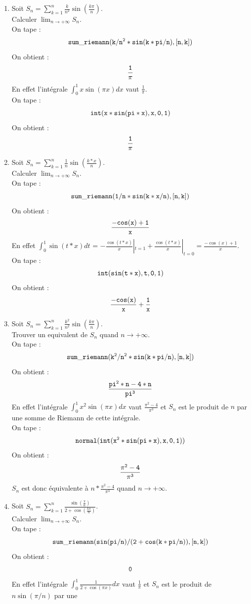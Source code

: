 \documentclass[a4paper,11pt]{book}
\begin{document}
\begin{enumerate} 
\item
Soit $\displaystyle S_n=\sum_{k=1}^n \frac{k}{n^2} \sin(\frac{k\pi}{n})$.\\
Calculer $\displaystyle \lim_{n \rightarrow +\infty} S_n$.\\
On tape :
$${\tt sum\_riemann(k/n^2*sin(k*pi/n),[n,k])}$$
On obtient :
$${\tt \frac{1}{\pi}}$$
En effet l'int\'egrale $\displaystyle \int_0^1 x \sin(\pi x)dx$ vaut
 $\displaystyle \frac{1}{\pi}$.\\
 On tape :
$${\tt int(x*sin(pi*x),x,0,1)}$$
On obtient :
$${\tt \frac{1}{\pi}}$$
\item
Soit $\displaystyle S_n=\sum_{k=1}^n \frac{1}{n} \sin(\frac{k*x}{n})$.\\
Calculer $\displaystyle \lim_{n \rightarrow +\infty} S_n$.\\
On tape :
$${\tt sum\_riemann(1/n*sin(k*x/n),[n,k])}$$
On obtient :
$${\tt \frac{-cos(x)+1}{x}}$$
En effet $\displaystyle \int_0^1 \sin(t* x)dt$ = $\displaystyle -\frac{\cos(t*x)}{x}|_{t=1} +\frac{\cos(t*x)}{x}|_{t=0}=\frac{-\cos(x)+1}{x}$.\\
 On tape :
$${\tt int(sin(t*x),t,0,1)}$$
On obtient :
$${\tt \frac{-cos(x)}{x}+\frac{1}{x}}$$
\item
Soit $\displaystyle S_n=\sum_{k=1}^n \frac{k^2}{n^2} \sin(\frac{k\pi}{n})$.\\
Trouver un equivalent de $S_n$ quand $n \rightarrow +\infty$.\\
On tape :
$${\tt sum\_riemann(k^2/n^2*sin(k*pi/n),[n,k])}$$
On obtient :
$${\tt \frac{pi^2*n-4*n}{pi^3}}$$
En effet l'int\'egrale $\displaystyle \int_0^1 x^2 \sin(\pi x)dx$ vaut
 $\displaystyle\frac{\pi^2-4}{\pi^3}$ et $S_n$ est le produit de $n$ par une somme
de Riemann de cette int\'egrale.\\
 On tape :
$${\tt normal(int(x^2*sin(pi*x),x,0,1))}$$
On obtient :
$${\tt \frac{\pi^2-4}{\pi^3}}$$
$S_n$ est donc \'equivalente \`a $\displaystyle n*\frac{\pi^2-4}{\pi^3}$
quand $n \rightarrow +\infty$. 
\item
Soit $\displaystyle S_n=\sum_{k=1}^n \frac{\sin(\frac{\pi}{n})}{2+\cos(\frac{k\pi}{n})}$.\\
Calculer $\displaystyle \lim_{n \rightarrow +\infty} S_n$.\\
On tape :
$${\tt sum\_riemann(sin(pi/n)/(2+cos(k*pi/n)),[n,k])}$$
On obtient :
$${\tt 0}$$
En effet l'int\'egrale $\displaystyle \int_0^1 \frac{1}{2+\cos(\pi x)}dx$ vaut
 $\displaystyle\frac{1}{\pi}$ et $S_n$ est le produit de $n\sin(\pi/n)$ par une 

\end{enumerate}
\end{document}
